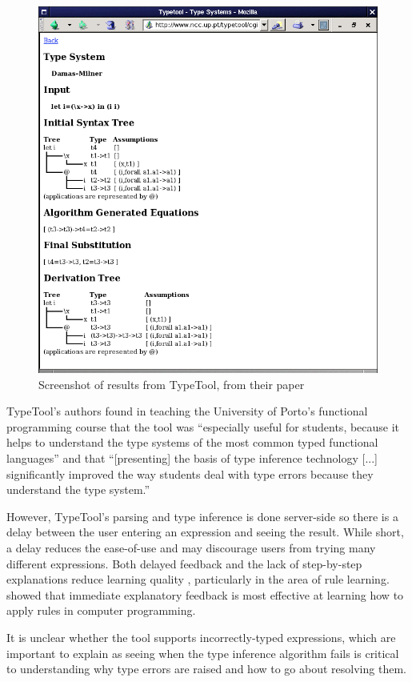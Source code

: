 \documentclass[a4paper,fleqn,oneside,12pt]{report}
\begin{document}
{\centering \begin{figure}[h!]
  \centering
  \includegraphics[width=0.75\linewidth]{images/image29.png}
  \caption{Screenshot of results from TypeTool, from their paper}
\end{figure} \par}

TypeTool's authors found in teaching the University of Porto's functional programming course that the tool was ``especially useful for students, because it helps to understand the type systems of the most common typed functional languages'' and that ``[presenting] the basis of type inference technology [...] significantly improved the way students deal with type errors because they understand the type system.''

However, TypeTool's parsing and type inference is done server-side so there is a delay between the user entering an expression and seeing the result. While short, a delay reduces the ease-of-use and may discourage users from trying many different expressions. Both delayed feedback and the lack of step-by-step explanations reduce learning quality \citep{ref5}, particularly in the area of rule learning. \cite{ref6} showed that immediate explanatory feedback is most effective at learning how to apply rules in computer programming.

It is unclear whether the tool supports incorrectly-typed expressions, which are important to explain as seeing when the type inference algorithm fails is critical to understanding why type errors are raised and how to go about resolving them.
\end{document}
